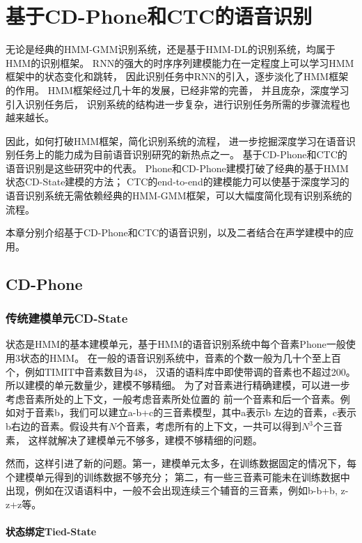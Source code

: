 ﻿%

\chapter{基于CD-Phone和CTC的语音识别}

无论是经典的HMM-GMM识别系统，还是基于HMM-DL的识别系统，均属于HMM的识别框架。
RNN的强大的时序序列建模能力在一定程度上可以学习HMM框架中的状态变化和跳转，
因此识别任务中RNN的引入，逐步淡化了HMM框架的作用。
HMM框架经过几十年的发展，已经非常的完善，
并且庞杂，深度学习引入识别任务后，
识别系统的结构进一步复杂，进行识别任务所需的步骤流程也越来越长。

因此，如何打破HMM框架，简化识别系统的流程，
进一步挖掘深度学习在语音识别任务上的能力成为目前语音识别研究的新热点之一。
基于CD-Phone和CTC的语音识别是这些研究中的代表。
Phone和CD-Phone建模打破了经典的基于HMM状态CD-State建模的方法；
CTC的end-to-end的建模能力可以使基于深度学习的语音识别系统无需依赖经典的HMM-GMM框架，可以大幅度简化现有识别系统的流程。

本章分别介绍基于CD-Phone和CTC的语音识别，以及二者结合在声学建模中的应用。

\section{CD-Phone}

\subsection{传统建模单元CD-State} \label{seg:cdstate}

状态是HMM的基本建模单元，基于HMM的语音识别系统中每个音素Phone一般使用3状态的HMM。
在一般的语音识别系统中，音素的个数一般为几十个至上百个，例如TIMIT中音素数目为48，
汉语的语料库中即使带调的音素也不超过200。所以建模的单元数量少，建模不够精细。
为了对音素进行精确建模，可以进一步考虑音素所处的上下文，一般考虑音素所处位置的
前一个音素和后一个音素。例如对于音素b，我们可以建立a-b+c的三音素模型，其中a表示b
左边的音素，c表示b右边的音素。假设共有$N$个音素，考虑所有的上下文，一共可以得到$N^3$个三音素，
这样就解决了建模单元不够多，建模不够精细的问题。

然而，这样引进了新的问题。第一，建模单元太多，在训练数据固定的情况下，每个建模单元得到的训练数据不够充分；
第二，有一些三音素可能未在训练数据中出现，例如在汉语语料中，一般不会出现连续三个辅音的三音素，例如b-b+b,
z-z+z等。

\subsubsection{状态绑定Tied-State}

